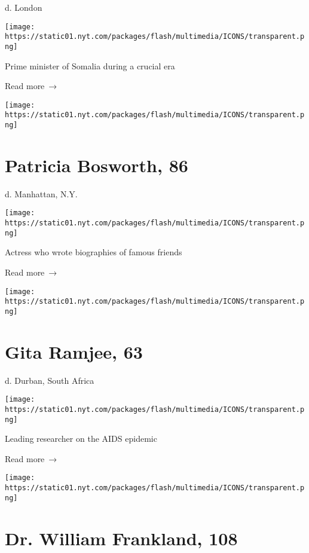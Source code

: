 d. London

\texttt{[image: https://static01.nyt.com/packages/flash/multimedia/ICONS/transparent.png]}

Prime minister of Somalia during a crucial era

 Read more~→

\href{https://www.nytimes.com/2020/04/03/books/patricia-bosworth-dead-virus.html}{}

\texttt{[image: https://static01.nyt.com/packages/flash/multimedia/ICONS/transparent.png]}

\hypertarget{patricia-bosworth-86}{%
\section{Patricia Bosworth, 86}\label{patricia-bosworth-86}}

d. Manhattan, N.Y.

\texttt{[image: https://static01.nyt.com/packages/flash/multimedia/ICONS/transparent.png]}

Actress who wrote biographies of famous friends

 Read more~→

\href{https://www.nytimes.com/2020/04/03/obituaries/gita-ramjee-dead-coronavirus.html}{}

\texttt{[image: https://static01.nyt.com/packages/flash/multimedia/ICONS/transparent.png]}

\hypertarget{gita-ramjee-63}{%
\section{Gita Ramjee, 63}\label{gita-ramjee-63}}

d. Durban, South Africa

\texttt{[image: https://static01.nyt.com/packages/flash/multimedia/ICONS/transparent.png]}

Leading researcher on the AIDS epidemic

 Read more~→

\href{https://www.nytimes.com/2020/04/03/science/william-frankland-dead-coronavirus.html}{}

\texttt{[image: https://static01.nyt.com/packages/flash/multimedia/ICONS/transparent.png]}

\hypertarget{dr-william-frankland-108}{%
\section{Dr. William Frankland, 108}\label{dr-william-frankland-108}}


